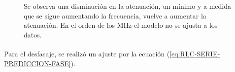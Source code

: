 \begin{figure} [H]
    \caption{Se observa una disminución en la atenuación, un mínimo y a medida que se sigue aumentando la frecuencia, vuelve a aumentar la atenuación. En el orden de los MHz el modelo no se ajusta a los datos.}
    \label{fig:atenuación_serie}
\end{figure}






\paragraph{}
Para el desfasaje, se realizó un ajuste por la ecuación (\ref{eq:RLC-SERIE-PREDICCION-FASE}).


